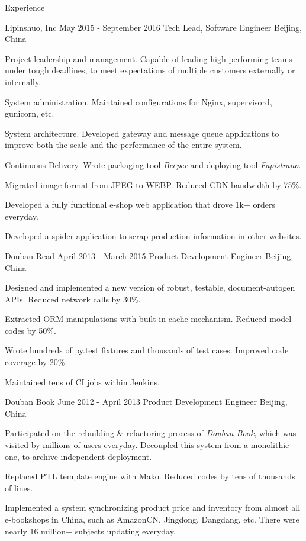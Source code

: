\documentclass{resume}
\begin{document}
\begin{rSection}{Experience}
    \begin{rSubsection}{Lipinshuo, Inc}{ May 2015 - September 2016 }{Tech Lead, Software Engineer }{Beijing, China}
    \item Project leadership and management. Capable of leading high performing teams under tough deadlines, to meet expectations of multiple customers externally or internally.
    \item System administration. Maintained configurations for Nginx, supervisord, gunicorn, etc.
    \item System architecture. Developed gateway and message queue applications to improve both the scale and the performance of the entire system.
    \item Continuous Delivery. Wrote packaging tool \href{https://github.com/soasme/beeper.py}{\textit{Beeper}} and deploying tool \href{https://github.com/liwushuo/fapistrano}{\textit{Fapistrano}}.
    \item Migrated image format from JPEG to WEBP. Reduced CDN bandwidth by 75\%.
    \item Developed a fully functional e-shop web application that drove 1k+ orders everyday.
    \item Developed a spider application to scrap production information in other websites.
    \end{rSubsection}

    \begin{rSubsection}{ Douban Read }{ April 2013 - March 2015 }{ Product Development Engineer }{Beijing, China}
    \item Designed and implemented a new version of robust, testable, document-autogen APIs. Reduced network calls by 30\%.
    \item Extracted ORM manipulations with built-in cache mechanism. Reduced model codes by 50\%.
    \item Wrote hundreds of py.test fixtures and thousands of test cases. Improved code coverage by 20\%.
    \item Maintained tens of CI jobs within Jenkins.
    \end{rSubsection}

    \begin{rSubsection}{Douban Book}{ June 2012 - April 2013 }{ Product Development Engineer }{Beijing, China}
    \item Participated on the rebuilding \& refactoring process of \href{book.douban.com}{\textit {Douban Book}}, which was visited by millions of users everyday. Decoupled this system from a monolithic one, to archive independent deployment.
    \item Replaced PTL template engine with Mako.  Reduced codes by tens of thousands of lines.
    \item Implemented a system synchronizing product price and inventory from almost all e-bookshops in China, such as AmazonCN, Jingdong, Dangdang, etc. There were nearly 16 million+ subjects updating everyday.
    \end{rSubsection}

  \end{rSection}
\end{document}
